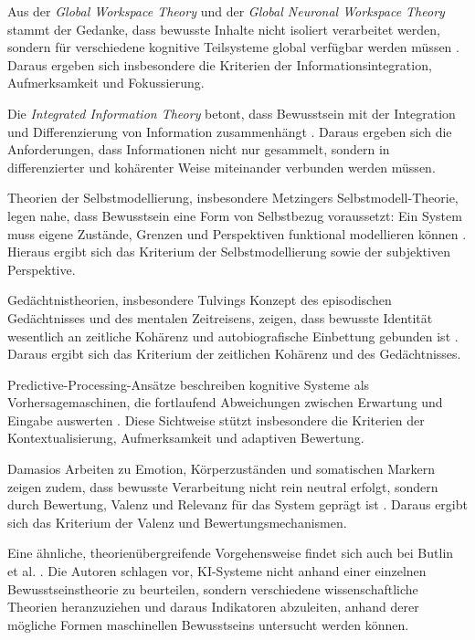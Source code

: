 Aus der \emph{Global Workspace Theory} und der \emph{Global Neuronal Workspace Theory} stammt der Gedanke, dass bewusste Inhalte nicht isoliert verarbeitet werden, sondern für verschiedene kognitive Teilsysteme global verfügbar werden müssen \cite{baars1988gwt,dehaene2014consciousness}. Daraus ergeben sich insbesondere die Kriterien der Informationsintegration, Aufmerksamkeit und Fokussierung.

Die \emph{Integrated Information Theory} betont, dass Bewusstsein mit der Integration und Differenzierung von Information zusammenhängt \cite{tononi2004iit}. Daraus ergeben sich die Anforderungen, dass Informationen nicht nur gesammelt, sondern in differenzierter und kohärenter Weise miteinander verbunden werden müssen.

Theorien der Selbstmodellierung, insbesondere Metzingers Selbstmodell-Theorie, legen nahe, dass Bewusstsein eine Form von Selbstbezug voraussetzt: Ein System muss eigene Zustände, Grenzen und Perspektiven funktional modellieren können \cite{Metzinger2003}. Hieraus ergibt sich das Kriterium der Selbstmodellierung sowie der subjektiven Perspektive.

Gedächtnistheorien, insbesondere Tulvings Konzept des episodischen Gedächtnisses und des mentalen Zeitreisens, zeigen, dass bewusste Identität wesentlich an zeitliche Kohärenz und autobiografische Einbettung gebunden ist \cite{tulving1985}. Daraus ergibt sich das Kriterium der zeitlichen Kohärenz und des Gedächtnisses.

Predictive-Processing-Ansätze beschreiben kognitive Systeme als Vorhersagemaschinen, die fortlaufend Abweichungen zwischen Erwartung und Eingabe auswerten \cite{Friston2010}. Diese Sichtweise stützt insbesondere die Kriterien der Kontextualisierung, Aufmerksamkeit und adaptiven Bewertung.

Damasios Arbeiten zu Emotion, Körperzuständen und somatischen Markern zeigen zudem, dass bewusste Verarbeitung nicht rein neutral erfolgt, sondern durch Bewertung, Valenz und Relevanz für das System geprägt ist \cite{Damasio1994,Damasio1999}. Daraus ergibt sich das Kriterium der Valenz und Bewertungsmechanismen.

Eine ähnliche, theorienübergreifende Vorgehensweise findet sich auch bei Butlin et al. \cite{Butlin2023}. Die Autoren schlagen vor, KI-Systeme nicht anhand einer einzelnen Bewusstseinstheorie zu beurteilen, sondern verschiedene wissenschaftliche Theorien heranzuziehen und daraus Indikatoren abzuleiten, anhand derer mögliche Formen maschinellen Bewusstseins untersucht werden können.

